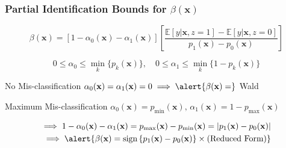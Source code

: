 \documentclass{beamer}
\begin{document}
\begin{frame}
  \frametitle{Partial Identification Bounds for $\beta(\mathbf{x})$}

    \footnotesize
    \[
      \boxed{ \beta(\mathbf{x}) = \left[ 1 - \alpha_0(\mathbf{x}) - \alpha_1(\mathbf{x}) \right] 
     \left[\frac{\mathbb{E}\left[y|\mathbf{x},z=1\right] - \mathbb{E}\left[y|\mathbf{x},z=0\right]}{p_1(\mathbf{x}) - p_0(\mathbf{x})}\right] }
    \]

    \footnotesize
    \[
      \boxed{ 0 \leq \alpha_0 \leq \min_k \{p_k(\mathbf{x})\}, \quad 0 \leq \alpha_1 \leq \min_k \{1 - p_k(\mathbf{x})\}}
    \]

    \normalsize
    \begin{block}{No Mis-classification}
      $\alpha_0(\mathbf{x}) =  \alpha_1(\mathbf{x}) = 0 \implies \alert{\beta(\mathbf{x}) = }$ \alert{Wald}
    \end{block}

    \begin{block}{Maximum Mis-classification}
      $\alpha_0(\mathbf{x}) = p_{\min}(\mathbf{x}), \, \alpha_1(\mathbf{x}) = 1 - p_{\max}(\mathbf{x})$

      \vspace{-0.5em}
      \begin{align*}
        \implies 1 - \alpha_0(\mathbf{x}) - \alpha_1(\mathbf{x}) = p_{\max}(\mathbf{x}) - p_{\min}(\mathbf{x})
      = |p_1(\mathbf{x}) - p_0(\mathbf{x})|\\
      \implies \alert{\beta(\mathbf{x}) =\mbox{sign}\left\{ p_1(\mathbf{x}) - p_0(\mathbf{x}) \right\}\times (\mbox{Reduced Form})}
    \end{align*}
      
    \end{block}
  
\end{frame}
\end{document}
